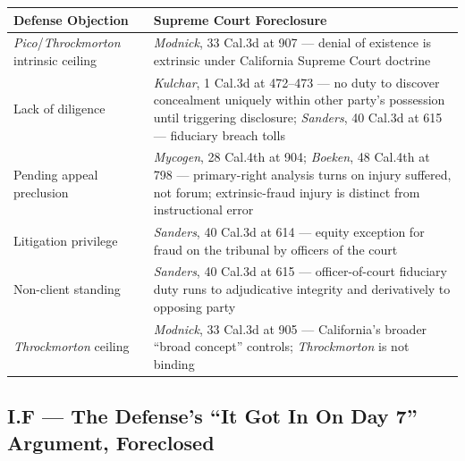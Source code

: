 {\def\LTcaptype{table} %
\begin{longtable}[]{@{}
  >{\raggedright\arraybackslash}p{}
  >{\raggedright\arraybackslash}p{}@{}}
\toprule\noalign{}
\begin{minipage}[b]{\linewidth}\raggedright
Defense Objection
\end{minipage} & \begin{minipage}[b]{\linewidth}\raggedright
Supreme Court Foreclosure
\end{minipage} \\
\midrule\noalign{}
\endhead
\bottomrule\noalign{}
\endlastfoot
\emph{Pico}/\emph{Throckmorton} intrinsic ceiling & \emph{Modnick}, 33 Cal.3d at 907 --- denial of existence is extrinsic under California Supreme Court doctrine \\
Lack of diligence & \emph{Kulchar}, 1 Cal.3d at 472--473 --- no duty to discover concealment uniquely within other party's possession until triggering disclosure; \emph{Sanders}, 40 Cal.3d at 615 --- fiduciary breach tolls \\
Pending appeal preclusion & \emph{Mycogen}, 28 Cal.4th at 904; \emph{Boeken}, 48 Cal.4th at 798 --- primary-right analysis turns on injury suffered, not forum; extrinsic-fraud injury is distinct from instructional error \\
Litigation privilege & \emph{Sanders}, 40 Cal.3d at 614 --- equity exception for fraud on the tribunal by officers of the court \\
Non-client standing & \emph{Sanders}, 40 Cal.3d at 615 --- officer-of-court fiduciary duty runs to adjudicative integrity and derivatively to opposing party \\
\emph{Throckmorton} ceiling & \emph{Modnick}, 33 Cal.3d at 905 --- California's broader ``broad concept'' controls; \emph{Throckmorton} is not binding \\
\end{longtable}
}

\subsection{I.F --- The Defense's ``It Got In On Day 7'' Argument, Foreclosed}\label{i.f-the-defenses-it-got-in-on-day-7-argument-foreclosed}

